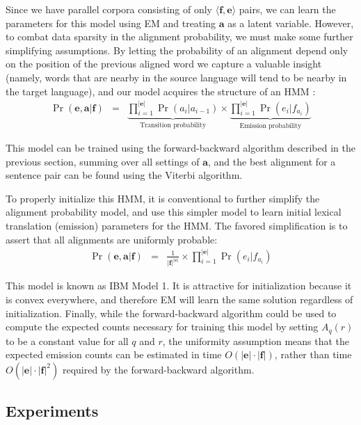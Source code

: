 \noindent Since we have parallel corpora consisting of only $\langle
\textbf{f}, \textbf{e} \rangle$ pairs, we can learn the parameters for
this model using EM and treating $\textbf{a}$ as a latent variable.
However, to combat data sparsity in the alignment probability, we must
make some further simplifying assumptions.  By letting the probability
of an alignment depend only on the position of the previous aligned
word we capture a valuable insight (namely, words that are nearby in
the source language will tend to be nearby in the target language),
and our model acquires the structure of an HMM \cite{Vogel_1996}:
\begin{eqnarray}
\Pr(\textbf{e}, \textbf{a} | \textbf{f}) & = & \underbrace{\prod_{i=1}^{|\textbf{e}|} \Pr(a_i | a_{i-1})}_{\textrm{Transition probability}} \times \underbrace{\prod_{i=1}^{|\textbf{e}|} \Pr(e_i|f_{a_i})}_{\textrm{Emission probability}} 
\end{eqnarray}

\noindent This model can be trained using the forward-backward
algorithm described in the previous section, summing over all settings
of $\textbf{a}$, and the best alignment for a sentence pair can be
found using the Viterbi algorithm.

To properly initialize this HMM, it is conventional to further
simplify the alignment probability model, and use this simpler model
to learn initial lexical translation (emission) parameters for the
HMM.  The favored simplification is to assert that all alignments are
uniformly probable:
\begin{eqnarray}
\Pr(\textbf{e}, \textbf{a} | \textbf{f}) & = & \frac{1}{|\textbf{f}|^{|\textbf{e}|}} \times \prod_{i=1}^{|\textbf{e}|} \Pr(e_i|f_{a_i}) 
\end{eqnarray}

\noindent This model is known as IBM Model 1.  It is attractive for
initialization because it is convex everywhere, and therefore EM will
learn the same solution regardless of initialization.  Finally, while
the forward-backward algorithm could be used to compute the expected
counts necessary for training this model by setting $A_q(r)$ to be a
constant value for all $q$ and $r$, the uniformity assumption means
that the expected emission counts can be estimated in time
$O(|\textbf{e}| \cdot |\textbf{f}|)$, rather than time $O(|\textbf{e}|
\cdot |\textbf{f}|^2)$ required by the forward-backward algorithm.

\subsection{Experiments}

